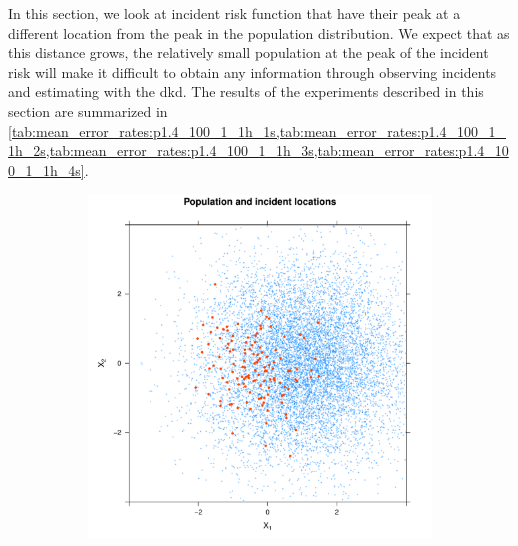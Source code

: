 In this section, we look at incident risk function that have their peak at a different location from the peak in the population distribution.
We expect that as this distance grows, the relatively small population at the peak of the incident risk will make it difficult to obtain any information through observing incidents and estimating with the \gls{dkd}.
The results of the experiments described in this section are summarized in \cref{tab:mean_error_rates:p1.4_100_1_1h_1s,tab:mean_error_rates:p1.4_100_1_1h_2s,tab:mean_error_rates:p1.4_100_1_1h_3s,tab:mean_error_rates:p1.4_100_1_1h_4s}.

\begin{figure}[htbp]
    \centering
    \begin{subfigure}{0.45\textwidth}
        \includegraphics[width=\textwidth]{results/p1.4_100_1_1h_2s/output/population_and_incidents_scatter}
        \label{fig:one_sample:p1.4_100_Gap_risk:2}
    \end{subfigure}
    \begin{subfigure}{0.45\textwidth}

\end{subfigure}
\end{figure}

